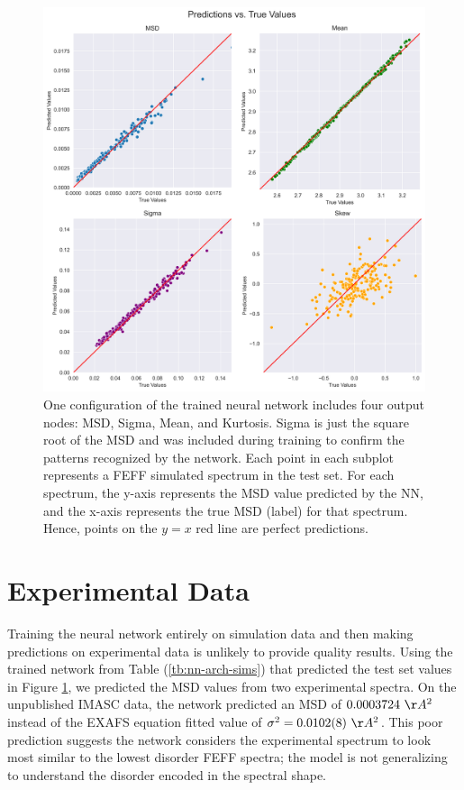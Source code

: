 \begin{figure}
    \centering
    \includegraphics[width=\linewidth]{Chapters/Figures/pa_train-test-fixed.png}
    \caption[Simulation Test Set Predictions]{One configuration of the trained neural network includes four output nodes: MSD, Sigma, Mean, and Kurtosis. Sigma is just the square root of the MSD and was included during training to confirm the patterns recognized by the network. Each point in each subplot represents a FEFF simulated spectrum in the test set. For each spectrum, the y-axis represents the MSD value predicted by the NN, and the x-axis represents the true MSD (label) for that spectrum. Hence, points on the $ y=x $ red line are perfect predictions.}
    \label{fig:train-test-split-all4}
\end{figure}

\section{Experimental Data} \label{ch:results}

Training the neural network entirely on simulation data and then making predictions on experimental data is unlikely to provide quality results. Using the trained network from Table (\ref{tb:nn-arch-sims}) that predicted the test set values in Figure \ref{fig:train-test-split-all4}, we predicted the MSD values from two experimental spectra. On the unpublished IMASC data, the network predicted an MSD of $0.0003724~\AA^2$ instead of the EXAFS equation fitted value of ${\sigma^2=0.0102(8)~\AA^2}$. This poor prediction suggests the network considers the experimental spectrum to look most similar to the lowest disorder FEFF spectra; the model is not generalizing to understand the disorder encoded in the spectral shape.


